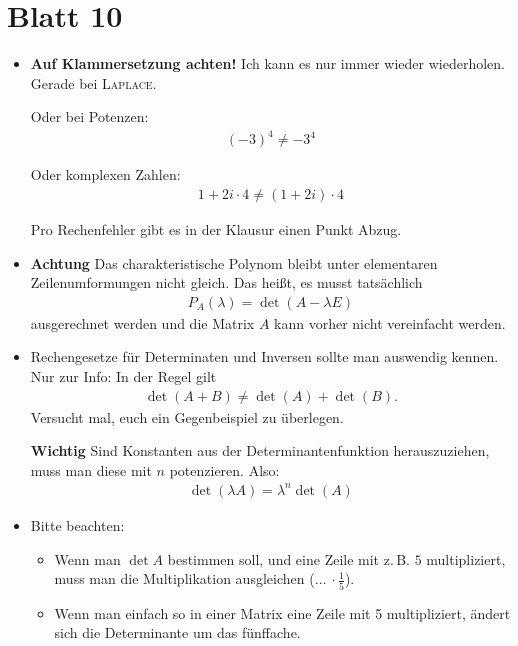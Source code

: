 \documentclass[11pt, a4paper]{article}
\begin{document}
\section*{Blatt 10}
\begin{itemize}
\item \textbf{Auf Klammersetzung achten!} Ich kann es nur immer wieder wiederholen. Gerade bei \textsc{Laplace}. 

Oder bei Potenzen:
\begin{align*}
(-3)^4 \neq -3^4
\end{align*}

Oder komplexen Zahlen:
\begin{align*}
1 + 2i\cdot 4 \neq (1 + 2i)\cdot 4
\end{align*}

Pro Rechenfehler gibt es in der Klausur einen Punkt Abzug. 

\item \textbf{Achtung} Das charakteristische Polynom bleibt unter elementaren Zeilenumformungen nicht gleich. Das heißt, es musst tatsächlich
\begin{align*}
P_A(\lambda) = \det(A - \lambda E)
\end{align*}
ausgerechnet werden und die Matrix $A$ kann vorher nicht vereinfacht werden.

\item Rechengesetze für Determinaten und Inversen sollte man auswendig kennen. Nur zur Info: In der Regel gilt
\begin{align*}
\det(A + B) \neq \det(A) + \det(B).
\end{align*}
Versucht mal, euch ein Gegenbeispiel zu überlegen.

\textbf{Wichtig} Sind Konstanten aus der Determinantenfunktion herauszuziehen, muss man diese mit $n$ potenzieren. Also:
\begin{align*}
\det(\lambda A) = \lambda^n \det(A)
\end{align*}

\item Bitte beachten:

\begin{itemize}
\item Wenn man $\det A$ bestimmen soll, und eine Zeile mit z.\,B. $5$ multipliziert, muss man die Multiplikation ausgleichen ($\dots~ \cdot \frac{1}{5}$).
\item Wenn man einfach so in einer Matrix eine Zeile mit 5 multipliziert, ändert sich die Determinante um das fünffache.
\end{itemize}


\end{itemize}
\end{document}
